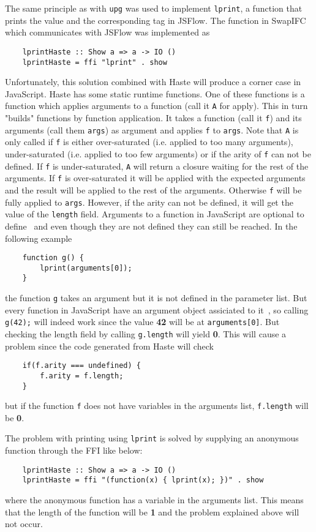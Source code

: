 The same principle as with {\tt upg} was used to implement {\tt lprint}, a function that prints the value and the corresponding tag in JSFlow. The function in SwapIFC which communicates with JSFlow was implemented as
\begin{verbatim}
    lprintHaste :: Show a => a -> IO ()
    lprintHaste = ffi "lprint" . show
\end{verbatim}
Unfortunately, this solution combined with Haste will produce a corner case in JavaScript. Haste has some static runtime functions. One of these functions is a function which applies arguments to a function (call it {\tt A} for apply). This in turn "builds" functions by function application. It takes a function (call it {\tt f}) and its arguments (call them {\tt args}) as argument and applies {\tt f} to {\tt args}. Note that {\tt A} is only called if {\tt f} is either over-saturated (i.e. applied to too many arguments), under-saturated (i.e. applied to too few arguments) or if the arity of {\tt f} can not be defined. If {\tt f} is under-saturated, {\tt A} will return a closure waiting for the rest of the arguments. If {\tt f} is over-saturated it will be applied with the expected arguments and the result will be applied to the rest of the arguments. Otherwise {\tt f} will be fully applied to {\tt args}. However, if the arity can not be defined, it will get the value of the {\tt length} field. Arguments to a function in JavaScript are optional to define~\cite{js-function} and even though they are not defined they can still be reached. In the following example
\begin{verbatim}
    function g() {
        lprint(arguments[0]);
    }
\end{verbatim}
the function {\tt g} takes an argument but it is not defined in the parameter list. But every function in JavaScript have an argument object assiciated to it~\cite{js-arguments}, so calling {\tt g(42);} will indeed work since the value \textbf{42} will be at {\tt arguments[0]}. But checking the length field by calling {\tt g.length} will yield \textbf{0}. This will cause a problem since the code generated from Haste will check
\begin{verbatim}
    if(f.arity === undefined) {
        f.arity = f.length;
    }
\end{verbatim}
but if the function {\tt f} does not have variables in the arguments list, {\tt f.length} will be \textbf{0}.

The problem with printing using {\tt lprint} is solved by supplying an anonymous function through the FFI like below:
\begin{verbatim}
    lprintHaste :: Show a => a -> IO ()
    lprintHaste = ffi "(function(x) { lprint(x); })" . show
\end{verbatim}
where the anonymous function has a variable in the arguments list. This means that the length of the function will be \textbf{1} and the problem explained above will not occur. 

